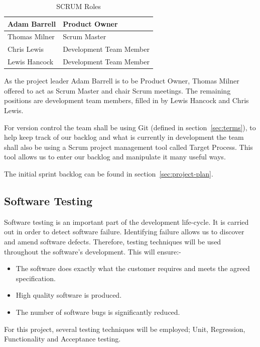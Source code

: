 \documentclass[11pt,a4paper]{article}
\begin{document}
\begin{table}[H]
\centering
\begin{tabular}{|l|l|}
\hline
Adam Barrell & Product Owner \\ \hline
Thomas Milner & Scrum Master \\ \hline
Chris Lewis & Development Team Member \\ \hline
Lewis Hancock & Development Team Member \\ \hline
\end{tabular}
\caption{SCRUM Roles}
\label{tab:scrumRoles}
\end{table}

As the project leader Adam Barrell is to be Product Owner, Thomas Milner offered to act as Scrum Master and chair Scrum meetings. The remaining positions are development team members, filled in by Lewis Hancock and Chris Lewis. 

For version control the team shall be using Git (defined in section~\ref{sec:terms}), to help keep track of our backlog and what is currently in development the team shall also be using a Scrum project management tool called Target Process. This tool allows us to enter our backlog and manipulate it many useful ways. 

The initial sprint backlog can be found in section~\ref{sec:project-plan}.

\subsection{Software Testing}
Software testing is an important part of the development life-cycle. It is carried out in order to detect software failure. Identifying failure allows us to discover and amend software defects. Therefore, testing techniques will be used throughout the software's development. This will ensure:- 
\begin{itemize}
\item The software does exactly what the customer requires and meets the agreed specification. 
\item High quality software is produced.
\item The number of software bugs is significantly reduced.
\end{itemize}

For this project, several testing techniques will be employed; Unit, Regression, Functionality and Acceptance testing.
\end{document}
